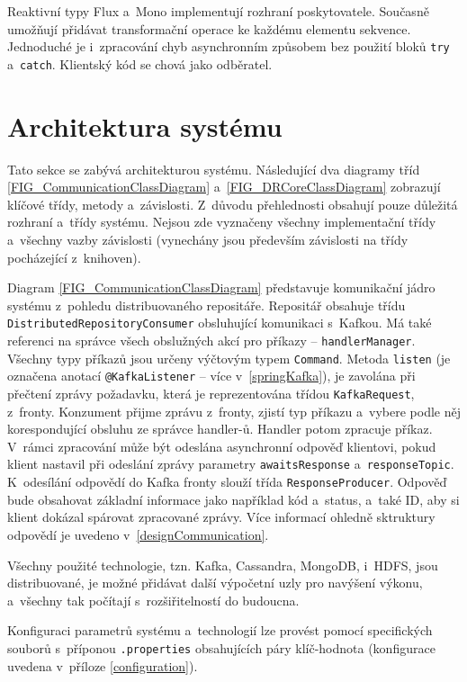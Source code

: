 \noindent Reaktivní typy Flux a~Mono implementují rozhraní poskytovatele. Současně umožňují přidávat transformační operace ke každému elementu sekvence. Jednoduché je i~zpracování chyb asynchronním způsobem bez použití bloků \texttt{try} a~\texttt{catch}. Klientský kód se chová jako odběratel.

\section{Architektura systému} \label{architecture}
Tato sekce se zabývá architekturou systému. Následující dva diagramy tříd \ref{FIG_CommunicationClassDiagram} a~\ref{FIG_DRCoreClassDiagram} zobrazují klíčové třídy, metody a~závislosti. Z~důvodu přehlednosti obsahují pouze důležitá rozhraní a~třídy systému. Nejsou zde vyznačeny všechny implementační třídy a~všechny vazby závislosti (vynechány jsou především závislosti na třídy pocházející z~knihoven).

Diagram \ref{FIG_CommunicationClassDiagram} představuje komunikační jádro systému z~pohledu distribuovaného repositáře. Repositář obsahuje třídu \texttt{DistributedRepositoryConsumer} obsluhující komunikaci s~Kafkou. Má také referenci na správce všech obslužných akcí pro příkazy -- \texttt{handlerManager}. Všechny typy příkazů jsou určeny výčtovým typem \texttt{Command}. Metoda \texttt{listen} (je označena anotací \texttt{@KafkaListener} -- více v~\ref{springKafka}), je zavolána při přečtení zprávy požadavku, která je reprezentována třídou \texttt{KafkaRequest}, z~fronty. Konzument přijme zprávu z~fronty, zjistí typ příkazu a~vybere podle něj korespondující obsluhu ze správce handler-ů. Handler potom zpracuje příkaz. V~rámci zpracování může být odeslána asynchronní odpověď klientovi, pokud klient nastavil při odeslání zprávy parametry \texttt{awaitsResponse} a~\texttt{responseTopic}. K~odesílání odpovědí do Kafka fronty slouží třída \texttt{ResponseProducer}. Odpověď bude obsahovat základní informace jako například kód a~status, a~také ID, aby si klient dokázal spárovat zpracované zprávy. Více informací ohledně sktruktury odpovědí je uvedeno v~\ref{designCommunication}.

Všechny použité technologie, tzn. Kafka, Cassandra, MongoDB, i~HDFS, jsou distribuované, je možné přidávat další výpočetní uzly pro navýšení výkonu, a~všechny tak počítají s~rozšiřitelností do budoucna.

Konfiguraci parametrů systému a~technologií lze provést pomocí specifických souborů s~příponou \texttt{.properties} obsahujících páry klíč-hodnota (konfigurace uvedena v~příloze \ref{configuration}).

